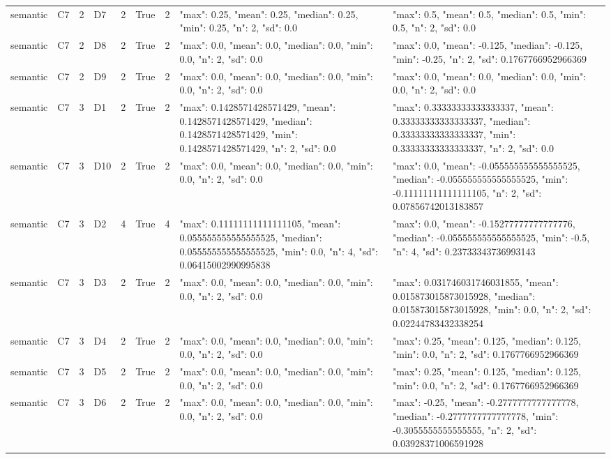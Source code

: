 \begin{tabular}{lllllllll}
semantic & C7 & 2 & D7 & 2 & True & 2 & {"max": 0.25, "mean": 0.25, "median": 0.25, "min": 0.25, "n": 2, "sd": 0.0} & {"max": 0.5, "mean": 0.5, "median": 0.5, "min": 0.5, "n": 2, "sd": 0.0} \\
semantic & C7 & 2 & D8 & 2 & True & 2 & {"max": 0.0, "mean": 0.0, "median": 0.0, "min": 0.0, "n": 2, "sd": 0.0} & {"max": 0.0, "mean": -0.125, "median": -0.125, "min": -0.25, "n": 2, "sd": 0.1767766952966369} \\
semantic & C7 & 2 & D9 & 2 & True & 2 & {"max": 0.0, "mean": 0.0, "median": 0.0, "min": 0.0, "n": 2, "sd": 0.0} & {"max": 0.0, "mean": 0.0, "median": 0.0, "min": 0.0, "n": 2, "sd": 0.0} \\
semantic & C7 & 3 & D1 & 2 & True & 2 & {"max": 0.1428571428571429, "mean": 0.1428571428571429, "median": 0.1428571428571429, "min": 0.1428571428571429, "n": 2, "sd": 0.0} & {"max": 0.33333333333333337, "mean": 0.33333333333333337, "median": 0.33333333333333337, "min": 0.33333333333333337, "n": 2, "sd": 0.0} \\
semantic & C7 & 3 & D10 & 2 & True & 2 & {"max": 0.0, "mean": 0.0, "median": 0.0, "min": 0.0, "n": 2, "sd": 0.0} & {"max": 0.0, "mean": -0.055555555555555525, "median": -0.055555555555555525, "min": -0.11111111111111105, "n": 2, "sd": 0.07856742013183857} \\
semantic & C7 & 3 & D2 & 4 & True & 4 & {"max": 0.11111111111111105, "mean": 0.055555555555555525, "median": 0.055555555555555525, "min": 0.0, "n": 4, "sd": 0.06415002990995838} & {"max": 0.0, "mean": -0.15277777777777776, "median": -0.055555555555555525, "min": -0.5, "n": 4, "sd": 0.23733343736993143} \\
semantic & C7 & 3 & D3 & 2 & True & 2 & {"max": 0.0, "mean": 0.0, "median": 0.0, "min": 0.0, "n": 2, "sd": 0.0} & {"max": 0.031746031746031855, "mean": 0.015873015873015928, "median": 0.015873015873015928, "min": 0.0, "n": 2, "sd": 0.02244783432338254} \\
semantic & C7 & 3 & D4 & 2 & True & 2 & {"max": 0.0, "mean": 0.0, "median": 0.0, "min": 0.0, "n": 2, "sd": 0.0} & {"max": 0.25, "mean": 0.125, "median": 0.125, "min": 0.0, "n": 2, "sd": 0.1767766952966369} \\
semantic & C7 & 3 & D5 & 2 & True & 2 & {"max": 0.0, "mean": 0.0, "median": 0.0, "min": 0.0, "n": 2, "sd": 0.0} & {"max": 0.25, "mean": 0.125, "median": 0.125, "min": 0.0, "n": 2, "sd": 0.1767766952966369} \\
semantic & C7 & 3 & D6 & 2 & True & 2 & {"max": 0.0, "mean": 0.0, "median": 0.0, "min": 0.0, "n": 2, "sd": 0.0} & {"max": -0.25, "mean": -0.2777777777777778, "median": -0.2777777777777778, "min": -0.3055555555555555, "n": 2, "sd": 0.03928371006591928} \\

\end{tabular}
